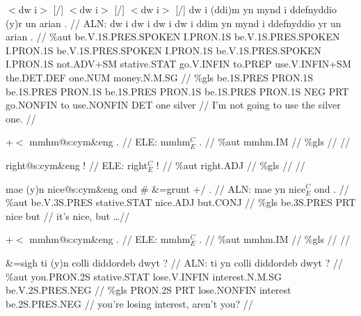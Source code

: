 \documentclass[a4paper,10pt]{article}
\begin{document}
\ex
\begingl[lingstyle=gergl]
\glchat $<$dw i$>$ [/] $<$dw i$>$ [/] $<$dw i$>$ [/] dw i (ddi)m yn mynd i ddefnyddio (y)r un arian . //
\glsurface ALN:  dw i dw i dw i dw i ddim yn mynd i ddefnyddio yr un arian .  //
\glauto \%aut  be{\scriptsize .V.1S.PRES.SPOKEN} I{\scriptsize .PRON.1S} be{\scriptsize .V.1S.PRES.SPOKEN} I{\scriptsize .PRON.1S} be{\scriptsize .V.1S.PRES.SPOKEN} I{\scriptsize .PRON.1S} be{\scriptsize .V.1S.PRES.SPOKEN} I{\scriptsize .PRON.1S} not{\scriptsize .ADV+SM} stative{\scriptsize .STAT} go{\scriptsize .V.INFIN} to{\scriptsize .PREP} use{\scriptsize .V.INFIN+SM} the{\scriptsize .DET.DEF} one{\scriptsize .NUM} money{\scriptsize .N.M.SG}   //
\glmanual \%gls  be{\scriptsize .1S.PRES} PRON{\scriptsize .1S} be{\scriptsize .1S.PRES} PRON{\scriptsize .1S} be{\scriptsize .1S.PRES} PRON{\scriptsize .1S} be{\scriptsize .1S.PRES} PRON{\scriptsize .1S} NEG PRT go{\scriptsize .NONFIN} to use{\scriptsize .NONFIN} DET one silver   //
\gleng I'm not going to use the silver one. //
\endgl
\xe

\ex
\begingl[lingstyle=gergl]
\glchat +$<$ mmhm@s:cym\&eng . //
\glsurface ELE:  mmhm$^{C}_{E}$ .  //
\glauto \%aut  mmhm{\scriptsize .IM}   //
\glmanual \%gls     //
\gleng  //
\endgl
\xe

\ex
\begingl[lingstyle=gergl]
\glchat right@s:cym\&eng ! //
\glsurface ELE:  right$^{C}_{E}$ !  //
\glauto \%aut  right{\scriptsize .ADJ}   //
\glmanual \%gls     //
\gleng  //
\endgl
\xe

\ex
\begingl[lingstyle=gergl]
\glchat mae (y)n nice@s:cym\&eng ond \# \&=grunt +/ . //
\glsurface ALN:  mae yn nice$^{C}_{E}$ ond .  //
\glauto \%aut  be{\scriptsize .V.3S.PRES} stative{\scriptsize .STAT} nice{\scriptsize .ADJ} but{\scriptsize .CONJ}   //
\glmanual \%gls  be{\scriptsize .3S.PRES} PRT nice but   //
\gleng it's nice, but \dots  //
\endgl
\xe

\ex
\begingl[lingstyle=gergl]
\glchat +$<$ mmhm@s:cym\&eng . //
\glsurface ELE:  mmhm$^{C}_{E}$ .  //
\glauto \%aut  mmhm{\scriptsize .IM}   //
\glmanual \%gls     //
\gleng  //
\endgl
\xe

\ex
\begingl[lingstyle=gergl]
\glchat \&=sigh ti (y)n colli diddordeb dwyt ? //
\glsurface ALN:  ti yn colli diddordeb dwyt ?  //
\glauto \%aut  you{\scriptsize .PRON.2S} stative{\scriptsize .STAT} lose{\scriptsize .V.INFIN} interest{\scriptsize .N.M.SG} be{\scriptsize .V.2S.PRES.NEG}   //
\glmanual \%gls  PRON{\scriptsize .2S} PRT lose{\scriptsize .NONFIN} interest be{\scriptsize .2S.PRES.NEG}   //
\gleng you're losing interest, aren't you? //
\endgl
\xe
\end{document}
